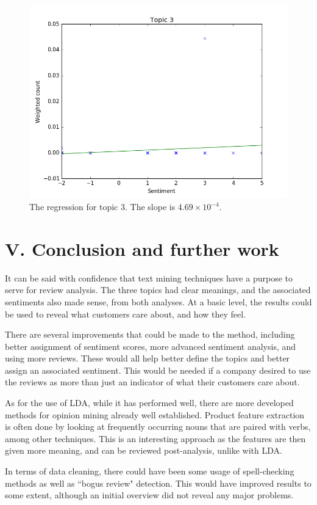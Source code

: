 \documentclass[onecolumn,prl,aps,10pt]{revtex4}
\begin{document}
\begin{figure}
\includegraphics*[clip]{topic3reg.png}
\caption{The regression for topic 3. The slope is $4.69 \times 10^{-4}$.} \label{top3}
\end{figure}


\section{V. Conclusion and further work}

It can be said with confidence that text mining techniques have a purpose to serve for review analysis. The three topics had clear meanings, and the associated sentiments also made sense, from both analyses. At a basic level, the results could be used to reveal what customers care about, and how they feel.

There are several improvements that could be made to the method, including better assignment of sentiment scores, more advanced sentiment analysis, and using more reviews. These would all help better define the topics and better assign an associated sentiment. This would be needed if a company desired to use the reviews as more than just an indicator of what their customers care about.

As for the use of LDA, while it has performed well, there are more developed methods for opinion mining already well established. Product feature extraction is often done by looking at frequently occurring nouns that are paired with verbs, among other techniques. This is an interesting approach as the features are then given more meaning, and can be reviewed post-analysis, unlike with LDA.

In terms of data cleaning, there could have been some usage of spell-checking methods as well as \textquotedblleft bogus review" detection. This would have improved results to some extent, although an initial overview did not reveal any major problems.
\end{document}
